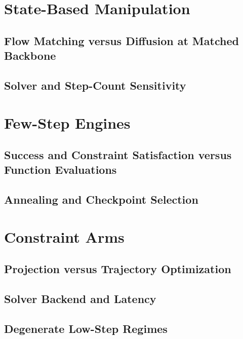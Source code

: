 \documentclass[headsepline,footsepline,footinclude=false,oneside,fontsize=11pt,paper=a4,listof=totoc,bibliography=totoc]{scrbook}
\begin{document}
\section{State-Based Manipulation}\label{sec:res:state}
\subsection{Flow Matching versus Diffusion at Matched Backbone}\label{sec:res:state:fm}
\subsection{Solver and Step-Count Sensitivity}\label{sec:res:state:solver}

\section{Few-Step Engines}\label{sec:res:fewstep}
\subsection{Success and Constraint Satisfaction versus Function Evaluations}\label{sec:res:fewstep:nfe}
\subsection{Annealing and Checkpoint Selection}\label{sec:res:fewstep:anneal}

\section{Constraint Arms}\label{sec:res:constraints}
\subsection{Projection versus Trajectory Optimization}\label{sec:res:constraints:arms}
\subsection{Solver Backend and Latency}\label{sec:res:constraints:backend}
\subsection{Degenerate Low-Step Regimes}\label{sec:res:constraints:degenerate}
\end{document}
